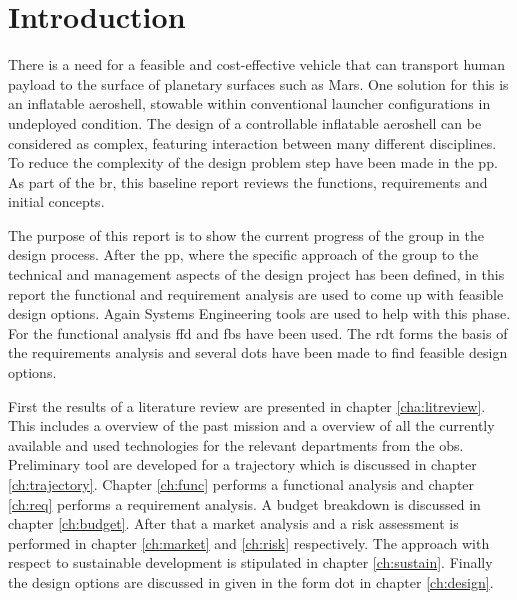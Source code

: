 \section{Introduction}\label{cha:introduction}
There is a need for a feasible and cost-effective vehicle that can transport human payload to the surface of planetary surfaces such as Mars. One solution for this is an inflatable aeroshell, stowable within conventional launcher configurations in undeployed condition. The design of a controllable inflatable aeroshell can be considered as complex, featuring interaction between many different disciplines. To reduce the complexity of the design problem step have been made in the \gls{pp}. As part of the \gls{br}, this baseline report reviews the functions, requirements and initial concepts.

The purpose of this report is to show the current progress of the group in the design process. After the \gls{pp}, where the specific approach of the group to the technical and management aspects of the design project has been defined, in this report the functional and requirement analysis are used to come up with feasible design options. Again Systems Engineering tools are used to help with this phase. For the functional analysis \gls{ffd} and \gls{fbs} have been used. The \gls{rdt} forms the basis of the requirements analysis and several \gls{dot}s have been made to find feasible design options.

First the results of a literature review are presented in chapter \ref{cha:litreview}. This includes a overview of the past mission and a overview of all the currently available and used technologies for the relevant departments from the \gls{obs}. Preliminary tool are developed for a trajectory which is discussed in chapter \ref{ch:trajectory}. Chapter \ref{ch:func} performs a functional analysis and chapter \ref{ch:req} performs a requirement analysis. A budget breakdown is discussed in chapter \ref{ch:budget}. After that a market analysis and a risk assessment is performed in chapter \ref{ch:market} and \ref{ch:risk} respectively. The approach with respect to sustainable development is stipulated in chapter \ref{ch:sustain}. Finally the design options are discussed in given in the form \gls{dot} in chapter \ref{ch:design}. 




